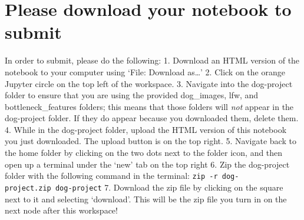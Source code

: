 \documentclass[11pt]{article}
\begin{document}
    \hypertarget{please-download-your-notebook-to-submit}{%
\section{Please download your notebook to
submit}\label{please-download-your-notebook-to-submit}}

In order to submit, please do the following: 1. Download an HTML version
of the notebook to your computer using `File: Download as\ldots{}' 2.
Click on the orange Jupyter circle on the top left of the workspace. 3.
Navigate into the dog-project folder to ensure that you are using the
provided dog\_images, lfw, and bottleneck\_features folders; this means
that those folders will \emph{not} appear in the dog-project folder. If
they do appear because you downloaded them, delete them. 4. While in the
dog-project folder, upload the HTML version of this notebook you just
downloaded. The upload button is on the top right. 5. Navigate back to
the home folder by clicking on the two dots next to the folder icon, and
then open up a terminal under the `new' tab on the top right 6. Zip the
dog-project folder with the following command in the terminal:
\texttt{zip\ -r\ dog-project.zip\ dog-project} 7. Download the zip file
by clicking on the square next to it and selecting `download'. This will
be the zip file you turn in on the next node after this workspace!


    
    
    
    
\end{document}
